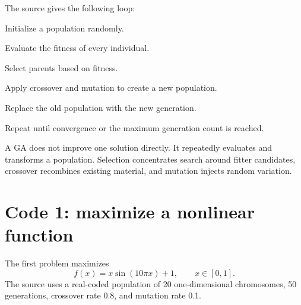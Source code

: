 The source gives the following loop:

\begin{mlsteps}
  \item Initialize a population randomly.
  \item Evaluate the fitness of every individual.
  \item Select parents based on fitness.
  \item Apply crossover and mutation to create a new population.
  \item Replace the old population with the new generation.
  \item Repeat until convergence or the maximum generation count is reached.
\end{mlsteps}

\begin{mlfigure}
\end{mlfigure}

\begin{keyidea}
A GA does not improve one solution directly. It repeatedly evaluates and transforms a population. Selection concentrates search around fitter candidates, crossover recombines existing material, and mutation injects random variation.
\end{keyidea}

\section{Code 1: maximize a nonlinear function}

The first problem maximizes
\[
f(x)=x\sin(10\pi x)+1,\qquad x\in[0,1].
\]
The source uses a real-coded population of 20 one-dimensional chromosomes, 50 generations, crossover rate 0.8, and mutation rate 0.1.

